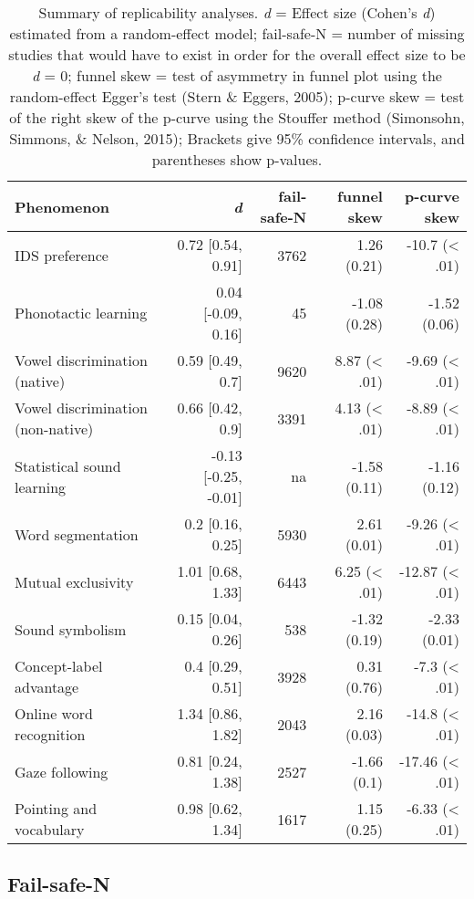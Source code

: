 \documentclass[english,floatsintext,man]{apa6}
\begin{document}
\begin{table}[t]
\footnotesize
\begin{tabular}{lrrrr}
\toprule
\textbf{Phenomenon} & \textbf{\textit{d}} & \textbf{fail-safe-N} & \textbf{funnel skew} & \textbf{p-curve skew}\\
\midrule

IDS preference & 0.72 [0.54, 0.91] & 3762 & 1.26 (0.21) & -10.7 (< .01)\\
Phonotactic learning & 0.04 [-0.09, 0.16] & 45 & -1.08 (0.28) & -1.52 (0.06)\\
Vowel discrimination (native) & 0.59 [0.49, 0.7] & 9620 & 8.87 (< .01) & -9.69 (< .01)\\
Vowel discrimination (non-native) & 0.66 [0.42, 0.9] & 3391 & 4.13 (< .01) & -8.89 (< .01)\\
Statistical sound learning & -0.13 [-0.25, -0.01] & na & -1.58 (0.11) & -1.16 (0.12)\\
Word segmentation & 0.2 [0.16, 0.25] & 5930 & 2.61 (0.01) & -9.26 (< .01)\\
Mutual exclusivity & 1.01 [0.68, 1.33] & 6443 & 6.25 (< .01) & -12.87 (< .01)\\
Sound symbolism & 0.15 [0.04, 0.26] & 538 & -1.32 (0.19) & -2.33 (0.01)\\
Concept-label advantage & 0.4 [0.29, 0.51] & 3928 & 0.31 (0.76) & -7.3 (< .01)\\
Online word recognition & 1.34 [0.86, 1.82] & 2043 & 2.16 (0.03) & -14.8 (< .01)\\
Gaze following & 0.81 [0.24, 1.38] & 2527 & -1.66 (0.1) & -17.46 (< .01)\\
Pointing and vocabulary & 0.98 [0.62, 1.34] & 1617 & 1.15 (0.25) & -6.33 (< .01)\\

\bottomrule
\end{tabular}
\caption{Summary of replicability analyses. \textit{d} = Effect size (Cohen's {\it d}) estimated from a random-effect model; fail-safe-N = number of missing studies that would have to exist in order for the overall effect size to be {\it d} = 0; funnel skew = test of asymmetry in funnel plot using the random-effect Egger's test (Stern \& Eggers, 2005); p-curve skew = test of the right skew of the p-curve using the Stouffer method (Simonsohn, Simmons, \& Nelson, 2015); Brackets give 95\% confidence intervals, and parentheses show p-values.}
\end{table}

\subsection{Fail-safe-N}\label{fail-safe-n}
\end{document}

